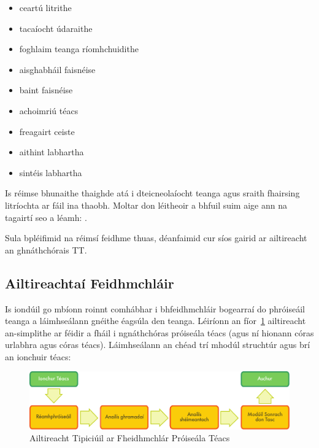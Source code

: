 \begin{multicols}{2}
\begin{itemize}
\item ceartú litrithe
\item tacaíocht údaraithe
\item foghlaim teanga ríomhchuidithe
\item aisghabháil faisnéise
\item baint faisnéise
\item achoimriú téacs
\item freagairt ceiste
\item aithint labhartha 
\item sintéis labhartha
\end{itemize}

Is réimse bhunaithe thaighde atá i dteicneolaíocht teanga agus sraith fhairsing litríochta ar fáil ina thaobh. Moltar don léitheoir a bhfuil suim aige ann na tagairtí seo a léamh: \cite{carstensen-etal1} \cite{jurafsky-martin01} \cite{manning-schuetze1} \cite{lt-world1} \cite{lt-survey1}. 

Sula bpléifimid na réimsí feidhme thuas, déanfaimid cur síos gairid ar ailtireacht an ghnáthchórais TT.

\subsection{Ailtireachtaí Feidhmchláir}

Is iondúil go mbíonn roinnt comhábhar i bhfeidhmchláir bogearraí do phróiseáil teanga a láimhseálann gnéithe éagsúla den teanga. Léiríonn an fíor~\ref{fig:textprocessingarch_de} ailtireacht an-simplithe ar féidir a fháil i ngnáthchóras próiseála téacs (agus ní hionann córas urlabhra agus córas téacs). Láimhseálann an chéad trí mhodúl struchtúr agus brí an ionchuir téacs:

\begin{figure}[hb]
  \center
  \includegraphics[width=\textwidth]{../_media/irish/text_processing_app_architecture}
  \caption{Ailtireacht Tipiciúil ar Fheidhmchlár Próiseála Téacs}
  \label{fig:textprocessingarch_de}
\end{figure}


\end{multicols}
